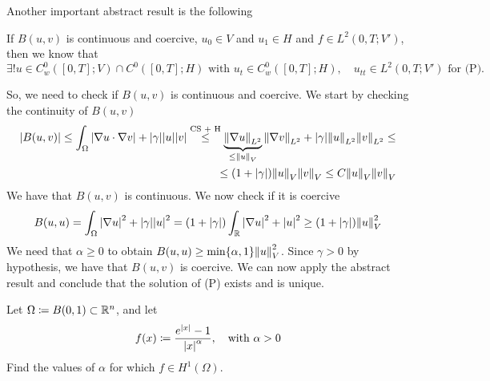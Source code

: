 Another important abstract result is the following
\begin{remark}
    If \(B(u, v)\) is continuous and coercive, \(u_0 \in V\) and \(u_1 \in H\) and \(f \in L^2(0, T; V')\), then we know that 
    \[
        \exists! u \in C_w^0([0, T]; V) \cap C^0([0, T]; H) \text{ with } u_t \in C_w^0([0, T]; H), \quad u_{tt} \in L^2(0, T; V') \text{ for (P).}
    \]
\end{remark}
So, we need to check if \(B(u, v)\) is continuous and coercive. We start by checking the continuity of \(B(u, v)\)
\[
    \begin{split}
        \abs{B(u, v)} \leq \int_\Omega \abs{\nabla u \cdot \nabla v} + \abs{\gamma} \abs{u} \abs{v} \overset{\text{CS + H}}{\leq} \underbrace{\norm{\nabla u}_{L^2}}_{\leq \norm{u}_V} \norm{\nabla v}_{L^2} + \abs{\gamma} \norm{u}_{L^2} \norm{v}_{L^2} \leq \\ 
        \leq (1 + \abs{\gamma}) \norm{u}_V \norm{v}_V \leq C \norm{u}_V \norm{v}_V
    \end{split}
\]
We have that \(B(u, v)\) is continuous. We now check if it is coercive
\[
    \begin{split}
        B(u, u) = \int_\Omega \abs{\nabla u}^2 + \abs{\gamma} \abs{u}^2 = (1 + \abs{\gamma}) \int_{\mathbb{R}} \abs{\nabla u}^2  + \abs{u}^2 \geq (1 + \abs{\gamma}) \norm{u}_V^2
    \end{split}
\]
We need that \(\alpha \geq 0\) to obtain \(B(u,u) \geq \min\{\alpha, 1\} \norm{u}_V^2\). Since \(\gamma > 0\) by hypothesis, we have that \(B(u, v)\) is coercive. We can now apply the abstract result and conclude that the solution of (P) exists and is unique.

\newpage
\begin{exercise}
    Let \(\Omega \coloneqq B(0, 1) \subset \mathbb{R}^n\), and let 
    \[
        f(x) \coloneqq \frac{e^{\abs{x}}-1}{\abs{x}^\alpha}, \quad \text{with } \alpha > 0
    \]
    Find the values of \(\alpha\) for which \(f \in H^1(\Omega)\).
\end{exercise}
